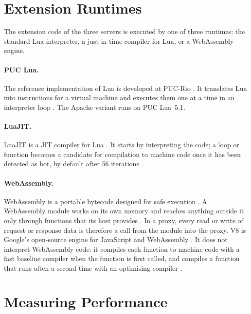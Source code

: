 \documentclass{rptuma}
\begin{document}
\section{Extension Runtimes}
\label{sec:bg.runtimes}

The extension code of the three servers is executed by one of three runtimes: the standard Lua
interpreter, a just-in-time compiler for Lua, or a WebAssembly engine.

\paragraph{PUC Lua.} The reference implementation of Lua is developed at PUC-Rio \cite{lua_about}. It translates Lua into instructions for a
virtual machine and executes them one at a time in an interpreter loop
\cite{ierusalimschy2005lua}. The Apache variant runs on PUC Lua~5.1.

\paragraph{LuaJIT.} LuaJIT is a JIT compiler for Lua \cite{luajit}. It starts by
interpreting the code; a loop or function becomes a candidate for compilation to machine code once
it has been detected as hot, by default after 56 iterations \cite{luajit_running}.

\paragraph{WebAssembly.} WebAssembly is a portable bytecode designed for safe execution
\cite{haas2017wasm}. A WebAssembly module works on its own memory and reaches anything outside it
only through functions that its host provides \cite{haas2017wasm}. In a proxy, every read or write
of request or response data is therefore a call from the module into the proxy. V8 is Google's
open-source engine for JavaScript and WebAssembly \cite{v8_home}. It does not interpret WebAssembly
code: it compiles each function to machine code with a fast baseline compiler when the function is
first called, and compiles a function that runs often a second time with an optimising compiler
\cite{v8_wasm_pipeline}.


\section{Measuring Performance}
\label{sec:bg.perf}
\end{document}
